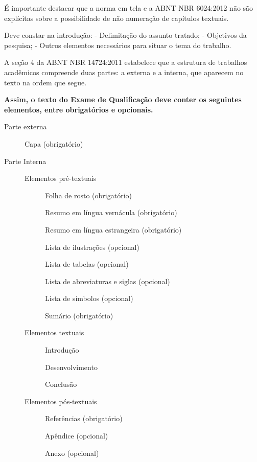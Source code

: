 \documentclass{templateppgmo}
\numberwithin{figure}{chapter}
\numberwithin{table}{chapter}
\numberwithin{quadro}{chapter}
\numberwithin{algoritmo}{chapter}
\numberwithin{codigo}{chapter}
\begin{document}
É importante destacar que a norma em tela e a ABNT NBR 6024:2012 não são explícitas sobre a possibilidade de não numeração de capítulos textuais. 

Deve constar na introdução:
- Delimitação do assunto tratado;
- Objetivos da pesquisa;
- Outros elementos necessários para situar o tema do trabalho.


A seção 4 da ABNT NBR 14724:2011 estabelece que a estrutura de trabalhos acadêmicos compreende duas partes: a externa e a interna, que aparecem no texto na ordem que segue. 

\textbf{Assim, o texto do Exame de Qualificação deve conter os seguintes elementos, entre obrigatórios e opcionais.}

\begin{description}
\item[Parte externa]\mbox{}

Capa (obrigatório) 


\item[Parte Interna]\mbox{}

\begin{description}
\item[Elementos pré-textuais]\mbox{}

Folha de rosto (obrigatório)

Resumo em língua vernácula (obrigatório) 

Resumo em língua estrangeira (obrigatório)

Lista de ilustrações (opcional)

Lista de tabelas (opcional)

Lista de abreviaturas e siglas (opcional)

Lista de símbolos (opcional) 

Sumário (obrigatório) 

\item[Elementos textuais]\mbox{}

Introdução 

Desenvolvimento

Conclusão 

\item[Elementos pós-textuais]\mbox{}

Referências (obrigatório) 

Apêndice (opcional) 

Anexo (opcional) 

\end{description}
\end{description}
\end{document}
